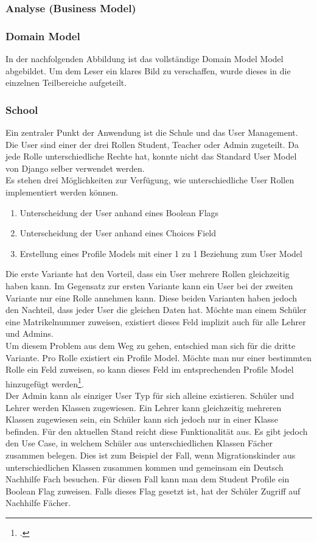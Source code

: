 \subsubsection{Analyse (Business Model)}
\subsubsection*{Domain Model}
In der nachfolgenden Abbildung ist das vollständige Domain Model Model abgebildet. Um dem Leser ein klares Bild zu verschaffen, wurde dieses in die einzelnen Teilbereiche aufgeteilt.

\subsubsection*{School}
Ein zentraler Punkt der Anwendung ist die Schule und das User Management. Die User sind einer der drei Rollen Student, Teacher oder Admin zugeteilt. Da jede Rolle unterschiedliche Rechte hat, konnte nicht das Standard User Model von Django selber verwendet werden. \\
Es stehen drei Möglichkeiten zur Verfügung, wie unterschiedliche User Rollen implementiert werden können.

\begin{enumerate}
	\item Unterscheidung der User anhand eines Boolean Flags
	\item Unterscheidung der User anhand eines Choices Field 
	\item Erstellung eines Profile Models mit einer 1 zu 1 Beziehung zum User Model
\end{enumerate}

Die erste Variante hat den Vorteil, dass ein User mehrere Rollen gleichzeitig haben kann. Im Gegensatz zur ersten Variante kann ein User bei der zweiten Variante nur eine Rolle annehmen kann. Diese beiden Varianten haben jedoch den Nachteil, dass jeder User die gleichen Daten hat. Möchte man einem Schüler eine Matrikelnummer zuweisen, existiert dieses Feld implizit auch für alle Lehrer und Admins. \\
Um diesem Problem aus dem Weg zu gehen, entschied man sich für die dritte Variante. Pro Rolle existiert ein Profile Model. Möchte man nur einer bestimmten Rolle ein Feld zuweisen, so kann dieses Feld im entsprechenden Profile Model hinzugefügt werden\footcite{django:user_types}. \\
Der Admin kann als einziger User Typ für sich alleine existieren. Schüler und Lehrer werden Klassen zugewiesen. Ein Lehrer kann gleichzeitig mehreren Klassen zugewiesen sein, ein Schüler kann sich jedoch nur in einer Klasse befinden. Für den aktuellen Stand reicht diese Funktionalität aus. Es gibt jedoch den Use Case, in welchem Schüler aus unterschiedlichen Klassen Fächer zusammen belegen. Dies ist zum Beispiel der Fall, wenn Migrationskinder aus unterschiedlichen Klassen zusammen kommen und gemeinsam ein Deutsch Nachhilfe Fach besuchen. Für diesen Fall kann man dem Student Profile ein Boolean Flag zuweisen. Falls dieses Flag gesetzt ist, hat der Schüler Zugriff auf Nachhilfe Fächer. \\

